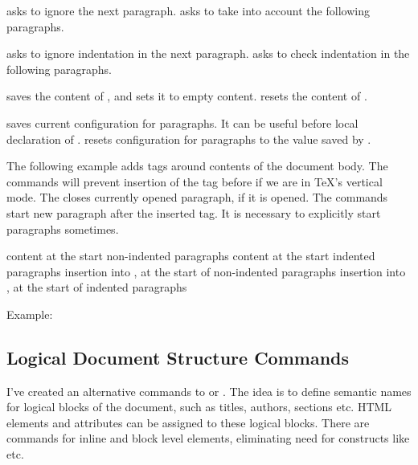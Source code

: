  asks to ignore the next paragraph.
 asks to take into account the following paragraphs.

  asks to ignore indentation in the next paragraph.
    asks to check indentation in the following paragraphs.

  saves the content of , and sets it to empty content.
 resets the content of .

 saves current configuration for paragraphs. It can be
useful before local declaration of .
 resets configuration for paragraphs to the value saved by
.


The following example adds  tags around contents of the document body.
The \texcommand{\ifvmode\IgnorePar\fi} commands will prevent insertion of the  tag 
before  if we are in \TeX's vertical mode. The \texcommand{\EndP} closes currently
opened paragraph, if it is opened. The \texcommand{\par\ShowPar} commands start new paragraph
after the inserted  tag. It is necessary to explicitly start paragraphs sometimes.

\begin{texsource}
{\ifvmode\IgnorePar\fi\EndP
 \par\ShowPar}
{\ifvmode\IgnorePar\fi\EndP
 }
\end{texsource}


 {content at the start non-indented paragraphs} 
   {content at the start indented paragraphs}
   {insertion into , at the start of non-indented paragraphs}
   {insertion into , at the start of indented paragraphs}\EndDoc

Example:

\begin{texsource}
{\EndP{}}
{\EndP{}}
{}
{}
\end{texsource}



\subsection{Logical Document Structure Commands}
I've created an alternative commands to  or . 
The idea is to define semantic names for logical blocks of the document, such as titles, authors,
sections etc. HTML elements and attributes can be assigned to these
logical blocks. There are commands for inline and block level elements,
eliminating need for constructs like \texcommand{\ifvmode\IgnorePar\fi\EndP}
etc.

